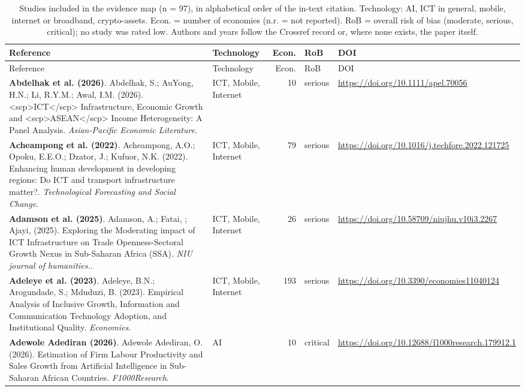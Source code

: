 {\scriptsize
\begin{longtable}{@{}p{7.4cm} p{1.3cm} r l p{3.4cm}@{}}
\caption{Studies included in the evidence map (n = 97), in alphabetical order of the in-text citation. Technology: AI, ICT in general, mobile, internet or broadband, crypto-assets. Econ. = number of economies (n.r. = not reported). RoB = overall risk of bias (moderate, serious, critical); no study was rated low. Authors and years follow the Crossref record or, where none exists, the paper itself.}\label{tab:included}\\
\toprule Reference & Technology & Econ. & RoB & DOI \\ \midrule \endfirsthead
\toprule Reference & Technology & Econ. & RoB & DOI \\ \midrule \endhead
\bottomrule \endfoot
\textbf{Abdelhak et al. (2026)}. Abdelhak, S.; AuYong, H.N.; Li, R.Y.M.; Awal, I.M. (2026). <scp>ICT</scp>
                    Infrastructure, Economic Growth and
                    <scp>ASEAN</scp>
                    Income Heterogeneity: A Panel Analysis. \emph{Asian-Pacific Economic Literature}. & ICT, Mobile, Internet & 10 & serious & \url{https://doi.org/10.1111/apel.70056} \\
\textbf{Acheampong et al. (2022)}. Acheampong, A.O.; Opoku, E.E.O.; Dzator, J.; Kufuor, N.K. (2022). Enhancing human development in developing regions: Do ICT and transport infrastructure matter?. \emph{Technological Forecasting and Social Change}. & ICT, Mobile, Internet & 79 & serious & \url{https://doi.org/10.1016/j.techfore.2022.121725} \\
\textbf{Adamson et al. (2025)}. Adamson, A.; Fatai, ; Ajayi,  (2025). Exploring the Moderating impact of ICT Infrastructure on Trade Openness-Sectoral Growth Nexus in Sub-Saharan Africa (SSA). \emph{NIU journal of humanities.}. & ICT, Mobile, Internet & 26 & serious & \url{https://doi.org/10.58709/niujhu.v10i3.2267} \\
\textbf{Adeleye et al. (2023)}. Adeleye, B.N.; Arogundade, S.; Mduduzi, B. (2023). Empirical Analysis of Inclusive Growth, Information and Communication Technology Adoption, and Institutional Quality. \emph{Economies}. & ICT, Mobile, Internet & 193 & serious & \url{https://doi.org/10.3390/economies11040124} \\
\textbf{Adewole Adediran (2026)}. Adewole Adediran, O. (2026). Estimation of Firm Labour Productivity and Sales Growth from Artificial Intelligence in Sub-Saharan African Countries. \emph{F1000Research}. & AI & 10 & critical & \url{https://doi.org/10.12688/f1000research.179912.1} \\

\end{longtable}}
